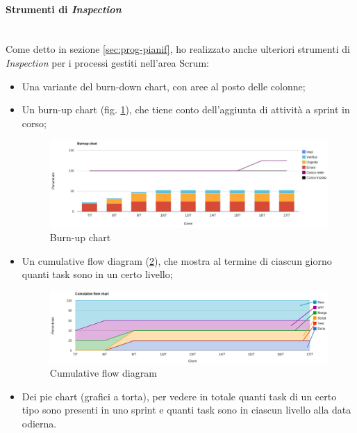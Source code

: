 \paragraph{Strumenti di \emph{Inspection}} \mbox{} \\

Come detto in sezione \ref{sec:prog-pianif}, ho realizzato anche ulteriori
strumenti di \emph{Inspection} per i processi gestiti nell'area Scrum:

\begin{itemize}
\item Una variante del burn-down chart, con aree al posto delle colonne;
\item Un burn-up chart (fig. \ref{fig:burnup}), che tiene conto dell'aggiunta
  di attività a sprint in corso;

  \begin{figure}[H]%
  \centering
  \includegraphics[width=1.1\columnwidth]{immagini/burnup}
  \caption{Burn-up chart}
  \label{fig:burnup}%
  \end{figure}

\item Un cumulative flow diagram (\ref{fig:cumulative}), che mostra al termine
  di ciascun giorno quanti task sono in un certo livello;

  \begin{figure}[H]%
  \centering
  \includegraphics[width=1.1\columnwidth]{immagini/cumulativeFlow}
  \caption{Cumulative flow diagram}
  \label{fig:cumulative}%
  \end{figure}

\item Dei pie chart (grafici a torta), per vedere in totale quanti task
  di un certo tipo sono presenti in uno sprint e quanti task sono in ciascun
  livello alla data odierna.
\end{itemize}

